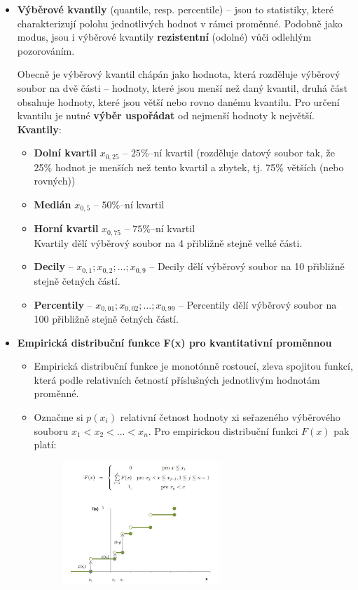 \begin{itemize}
	\item \textbf{Výběrové kvantily} (quantile, resp. percentile) -- jsou to statistiky, které charakterizují polohu jednotlivých hodnot v rámci proměnné. Podobně jako modus, jsou i výběrové kvantily \textbf{rezistentní} (odolné) vůči odlehlým pozorováním.
	
	Obecně je výběrový kvantil chápán jako hodnota, která rozděluje výběrový soubor na dvě části -- hodnoty, které jsou menší než daný kvantil, druhá část obsahuje hodnoty, které jsou větší nebo rovno danému kvantilu. Pro určení kvantilu je nutné \textbf{výběr uspořádat} od nejmenší hodnoty k největší. \textbf{Kvantily}:
		\begin{itemize}
			\item \textbf{Dolní kvartil} $x_{0,25}$ -- $25\%$--ní kvartil  (rozděluje datový soubor tak, že 25\% hodnot je menších než tento kvartil a zbytek, tj. 75\% větších (nebo rovných))
			\item \textbf{Medián} $x_{0,5}$ -- $50\%$--ní kvartil
			\item \textbf{Horní kvartil} $x_{0,75}$ -- $75\%$--ní kvartil\\
			Kvartily dělí výběrový soubor na 4 přibližně stejně velké části.
			\item \textbf{Decily} -- $x_{0,1};x_{0,2};...;x_{0,9}$ -- Decily dělí výběrový soubor na 10 přibližně stejně četných částí.
			\item \textbf{Percentily} -- $x_{0,01};x_{0,02};...;x_{0,99}$ -- Percentily dělí výběrový soubor na 100 přibližně stejně četných částí.
		\end{itemize}

	\item \textbf{Empirická distribuční funkce F(x) pro kvantitativní proměnnou}
	\begin{itemize}
		\item Empirická distribuční funkce je monotónně rostoucí, zleva spojitou funkcí, která  podle relativních četností příslušných jednotlivým hodnotám proměnné. 
		\item Označme si $p(x_i)$ relativní četnost hodnoty xi seřazeného výběrového souboru $x_1 < x_2 < ... < x_n$. Pro empirickou distribuční funkci $F(x)$ pak platí:
				\begin{figure}[H]
				\centering
				\includegraphics[width=0.6\textwidth]{assets/13_empiricka}
				\end{figure}
	\end{itemize}


\end{itemize}
